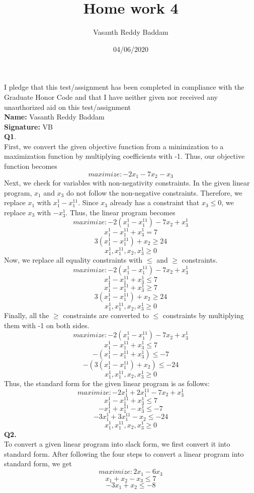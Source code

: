 \documentclass[11pt]{article}
\title{Home work 4}
\author{Vasanth Reddy Baddam}
\date{04/06/2020}
\begin{document}
\maketitle
I pledge that this test/assignment has been completed in compliance with the Graduate Honor Code and
that I have neither given nor received any unauthorized aid on this test/assignment\\
\textbf{Name: } Vasanth Reddy Baddam\\
\textbf{Signature: } VB\\
\hline
\vspace{5mm}
\textbf{Q1}.\\
First, we convert the given objective function from a minimization to a maximization function by multiplying coefficients with -1. Thus, our objective function becomes
$$maximize: -2x_1 - 7x_2 - x_3$$
Next, we check for variables with non-negativity constraints. In the given linear program, $x_1$ and $x_3$ do not follow the non-negative constraints. Therefore, we replace $x_1$ with $x_1^1-x_1^{11}$. Since $x_3$ already has a constraint that $x_3 \leq 0$, we replace $x_3$ with $-x_3^1$. Thus, the linear program becomes
$$maximize: -2(x_1^1 - x_1^{11}) - 7x_2 + x_3^1$$
$$x_1^1 - x_1^{11} + x_3^1 = 7$$
$$3(x_1^1 - x_1^{11}) + x_2 \geq 24$$
$$x_1^1,x_1^{11},x_2,x_3^1 \geq 0$$
Now, we replace all equality constraints with $\leq$ and $\geq$ constraints.
$$maximize: -2(x_1^1 - x_1^{11}) - 7x_2 + x_3^1$$
$$x_1^1 - x_1^{11} + x_3^1 \leq 7$$
$$x_1^1 - x_1^{11} + x_3^1 \geq 7$$
$$3(x_1^1 - x_1^{11}) + x_2 \geq 24$$
$$x_1^1,x_1^{11},x_2,x_3^1 \geq 0$$
Finally, all the $\geq$ constraints are converted to $\leq$ constraints by multiplying them with -1 on both sides. 
$$maximize: -2(x_1^1 - x_1^{11}) - 7x_2 + x_3^1$$
$$x_1^1 - x_1^{11} + x_3^1 \leq 7$$
$$-(x_1^1 - x_1^{11} + x_3^1) \leq -7$$
$$-(3(x_1^1 - x_1^{11}) + x_2) \leq -24$$
$$x_1^1,x_1^{11},x_2,x_3^1 \geq 0$$
Thus, the standard form for the given linear program is as follows:
$$maximize: -2x_1^1 + 2x_1^{11} - 7x_2 + x_3^1$$
$$x_1^1 - x_1^{11} + x_3^1 \leq 7$$
$$-x_1^1 + x_1^{11} - x_3^1 \leq -7$$
$$-3x_1^1 + 3x_1^{11} - x_2 \leq -24$$
$$x_1^1,x_1^{11},x_2,x_3^1 \geq 0$$
\vspace{5mm}
\hline
\vspace{5mm}
\textbf{Q2.}\\ 
To convert a given linear program into slack form, we first convert it into standard form. After following the four steps to convert a linear program into standard form, we get
$$maximize: 2x_1 - 6x_3$$
$$x_1 + x_2 - x_3 \leq 7$$
$$-3x_1 + x_2 \leq -8$$
\end{document}
